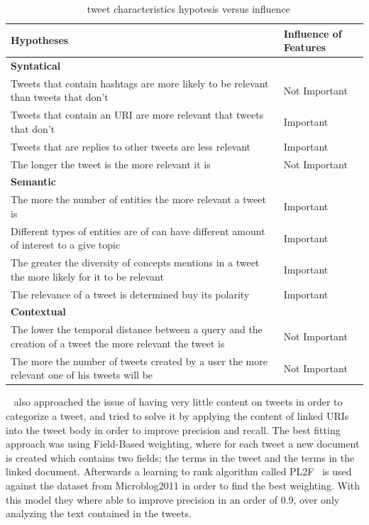 \begin{table}[tb]
  \caption{~\citet{Tao2012} tweet characteristics hypotesis versus influence}
  \label{tab:tao_table}
  \begin{tabularx}{\textwidth}{|X|l|}
  \hline
  \textbf{Hypotheses} & \textbf{Influence of Features} \\
  \hline
  \hline

  {\bf Syntatical} &  \\
  \hline
  Tweets that contain hashtags are more likely to be relevant than tweets that don't & Not Important \\
  \hline
  Tweets that contain an URI are more relevant that tweets that don't  &Important \\
  \hline
  Tweets that are replies to other tweets are less relevant & Important \\
  \hline
  The longer the tweet is the more relevant it is & Not Important\\
  \hline
  \hline

  {\bf Semantic}  &  \\
  \hline
  
  The more the number of entities the more relevant a tweet is  & Important \\
  \hline
  Different types of entities are of can have different amount of interest to a give topic  & Important \\
  \hline
  The greater the diversity of concepts mentions in a tweet the more likely for it to be relevant & Important \\
  \hline
  The relevance of a tweet is determined buy its polarity & Important \\
  \hline
  \hline

  {\bf Contextual} &  \\
  \hline
  The lower the temporal distance between a query and the creation of a tweet the more relevant the tweet is  & Not Important \\
  \hline
  The more the number of tweets created by a user the more relevant one of his tweets will be & Not Important \\
  \hline
  \end{tabularx}
\end{table}

~\citet{McCreadie2013} also approached the issue of having very little content on tweets in order to categorize a tweet, and tried to solve it by applying the content of linked URIs into the tweet body in order to improve precision and recall. The best fitting approach was using Field-Based weighting, where for each tweet a new document is created which contains two fields; the terms in the tweet and the terms in the linked document. 
Afterwards a learning to rank algorithm called PL2F~\cite{macdonald2008} is used against the dataset from Microblog2011 in order to find the best weighting. 
With this model they where able to improve precision in an order of 0.9, over only analyzing the text contained in the tweets. 

